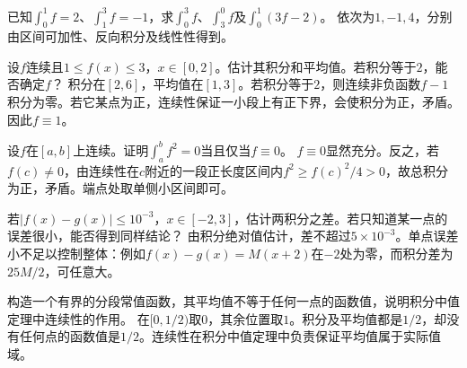 已知\(\int_0^1f=2\)、\(\int_1^3f=-1\)，求\(\int_0^3f\)、\(\int_3^0f\)及\(\int_0^1(3f-2)\)。
\solutionanswer
依次为\(1,-1,4\)，分别由区间可加性、反向积分及线性性得到。


设\(f\)连续且\(1\le f(x)\le3\)，\(x\in[0,2]\)。估计其积分和平均值。若积分等于\(2\)，能否确定\(f\)？
\solutionanswer
积分在\([2,6]\)，平均值在\([1,3]\)。若积分等于\(2\)，则连续非负函数\(f-1\)积分为零。若它某点为正，连续性保证一小段上有正下界，会使积分为正，矛盾。因此\(f\equiv1\)。


设\(f\)在\([a,b]\)上连续。证明\(\int_a^b f^2=0\)当且仅当\(f\equiv0\)。
\solutionanswer
\(f\equiv0\)显然充分。反之，若\(f(c)\ne0\)，由连续性在\(c\)附近的一段正长度区间内\(f^2\ge f(c)^2/4>0\)，故总积分为正，矛盾。端点处取单侧小区间即可。


若\(|f(x)-g(x)|\le10^{-3}\)，\(x\in[-2,3]\)，估计两积分之差。若只知道某一点的误差很小，能否得到同样结论？
\solutionanswer
由积分绝对值估计，差不超过\(5\times10^{-3}\)。单点误差小不足以控制整体：例如\(f(x)-g(x)=M(x+2)\)在\(-2\)处为零，而积分差为\(25M/2\)，可任意大。


构造一个有界的分段常值函数，其平均值不等于任何一点的函数值，说明积分中值定理中连续性的作用。
\solutionanswer
在\([0,1/2)\)取\(0\)，其余位置取\(1\)。积分及平均值都是\(1/2\)，却没有任何点的函数值是\(1/2\)。连续性在积分中值定理中负责保证平均值属于实际值域。
\par
